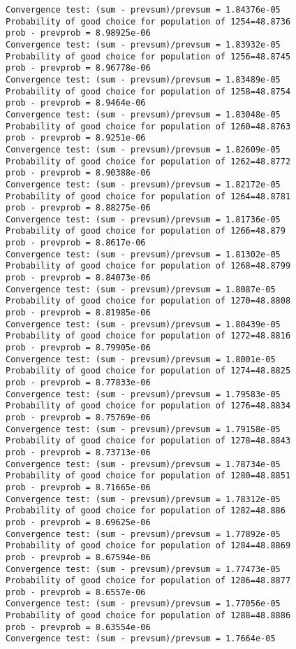 \documentclass[11pt,onecolumn]{article}
\begin{document}
\begin{verbatim}
Convergence test: (sum - prevsum)/prevsum = 1.84376e-05
Probability of good choice for population of 1254=48.8736
prob - prevprob = 8.98925e-06
Convergence test: (sum - prevsum)/prevsum = 1.83932e-05
Probability of good choice for population of 1256=48.8745
prob - prevprob = 8.96778e-06
Convergence test: (sum - prevsum)/prevsum = 1.83489e-05
Probability of good choice for population of 1258=48.8754
prob - prevprob = 8.9464e-06
Convergence test: (sum - prevsum)/prevsum = 1.83048e-05
Probability of good choice for population of 1260=48.8763
prob - prevprob = 8.9251e-06
Convergence test: (sum - prevsum)/prevsum = 1.82609e-05
Probability of good choice for population of 1262=48.8772
prob - prevprob = 8.90388e-06
Convergence test: (sum - prevsum)/prevsum = 1.82172e-05
Probability of good choice for population of 1264=48.8781
prob - prevprob = 8.88275e-06
Convergence test: (sum - prevsum)/prevsum = 1.81736e-05
Probability of good choice for population of 1266=48.879
prob - prevprob = 8.8617e-06
Convergence test: (sum - prevsum)/prevsum = 1.81302e-05
Probability of good choice for population of 1268=48.8799
prob - prevprob = 8.84073e-06
Convergence test: (sum - prevsum)/prevsum = 1.8087e-05
Probability of good choice for population of 1270=48.8808
prob - prevprob = 8.81985e-06
Convergence test: (sum - prevsum)/prevsum = 1.80439e-05
Probability of good choice for population of 1272=48.8816
prob - prevprob = 8.79905e-06
Convergence test: (sum - prevsum)/prevsum = 1.8001e-05
Probability of good choice for population of 1274=48.8825
prob - prevprob = 8.77833e-06
Convergence test: (sum - prevsum)/prevsum = 1.79583e-05
Probability of good choice for population of 1276=48.8834
prob - prevprob = 8.75769e-06
Convergence test: (sum - prevsum)/prevsum = 1.79158e-05
Probability of good choice for population of 1278=48.8843
prob - prevprob = 8.73713e-06
Convergence test: (sum - prevsum)/prevsum = 1.78734e-05
Probability of good choice for population of 1280=48.8851
prob - prevprob = 8.71665e-06
Convergence test: (sum - prevsum)/prevsum = 1.78312e-05
Probability of good choice for population of 1282=48.886
prob - prevprob = 8.69625e-06
Convergence test: (sum - prevsum)/prevsum = 1.77892e-05
Probability of good choice for population of 1284=48.8869
prob - prevprob = 8.67594e-06
Convergence test: (sum - prevsum)/prevsum = 1.77473e-05
Probability of good choice for population of 1286=48.8877
prob - prevprob = 8.6557e-06
Convergence test: (sum - prevsum)/prevsum = 1.77056e-05
Probability of good choice for population of 1288=48.8886
prob - prevprob = 8.63554e-06
Convergence test: (sum - prevsum)/prevsum = 1.7664e-05

\end{verbatim}
\end{document}

